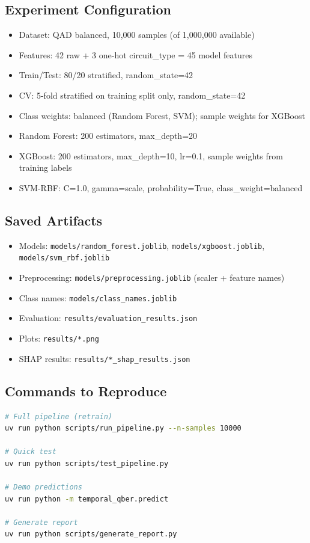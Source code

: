 \documentclass[a4paper,11pt]{article}
\begin{document}
\subsection{Experiment Configuration}
\begin{itemize}
    \item Dataset: QAD balanced, 10,000 samples (of 1,000,000 available)
    \item Features: 42 raw + 3 one-hot circuit\_type = 45 model features
    \item Train/Test: 80/20 stratified, random\_state=42
    \item CV: 5-fold stratified on training split only, random\_state=42
    \item Class weights: balanced (Random Forest, SVM); sample weights for XGBoost
    \item Random Forest: 200 estimators, max\_depth=20
    \item XGBoost: 200 estimators, max\_depth=10, lr=0.1, sample weights from training labels
    \item SVM-RBF: C=1.0, gamma=scale, probability=True, class\_weight=balanced
\end{itemize}

\subsection{Saved Artifacts}
\begin{itemize}
    \item Models: \texttt{models/random\_forest.joblib}, \texttt{models/xgboost.joblib}, \texttt{models/svm\_rbf.joblib}
    \item Preprocessing: \texttt{models/preprocessing.joblib} (scaler + feature names)
    \item Class names: \texttt{models/class\_names.joblib}
    \item Evaluation: \texttt{results/evaluation\_results.json}
    \item Plots: \texttt{results/*.png}
    \item SHAP results: \texttt{results/*\_shap\_results.json}
\end{itemize}

\subsection{Commands to Reproduce}
\begin{lstlisting}[language=bash]
# Full pipeline (retrain)
uv run python scripts/run_pipeline.py --n-samples 10000

# Quick test
uv run python scripts/test_pipeline.py

# Demo predictions
uv run python -m temporal_qber.predict

# Generate report
uv run python scripts/generate_report.py
\end{lstlisting}
\end{document}

